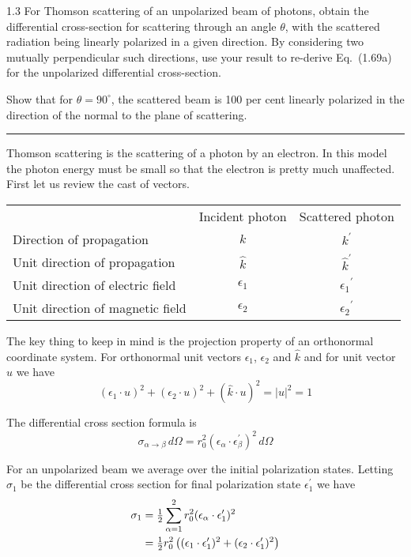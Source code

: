 \documentclass[12pt]{article}
\begin{document}
1.3
For Thomson scattering of an unpolarized beam of photons, obtain the
differential cross-section for scattering through an angle $\theta$,
with the scattered radiation being linearly polarized in a given
direction. By considering two mutually perpendicular such directions,
use your result to re-derive Eq.~(1.69a) for the unpolarized differential
cross-section.

\bigskip
Show that for $\theta=90^\circ$, the scattered beam is
100 per cent linearly polarized in the direction of the normal to the
plane of scattering.

\bigskip
\hrule

\bigskip
Thomson scattering is the scattering of a photon by an electron.
In this model the photon energy must be small so that the electron is
pretty much unaffected.
First let us review the cast of vectors.

\begin{center}
\begin{tabular}{lcc}
& Incident photon & Scattered photon
\\
Direction of propagation & $k$ & $k^\prime$
\\
Unit direction of propagation & $\hat k$ & ${\hat k}^\prime$
\\
Unit direction of electric field & $\epsilon_1$ & ${\epsilon_1}^\prime$
\\
Unit direction of magnetic field & $\epsilon_2$ & ${\epsilon_2}^\prime$
\end{tabular}
\end{center}

The key thing to keep in mind is the projection property of
an orthonormal coordinate system. For orthonormal unit vectors
$\epsilon_1$, $\epsilon_2$ and $\hat k$ and for unit vector $u$
we have
\begin{equation*}
(\epsilon_1\cdot u)^2+(\epsilon_2\cdot u)^2+(\hat k\cdot u)^2=|u|^2=1
\tag{1}
\end{equation*}

The differential cross section formula is
\begin{equation*}
\sigma_{\alpha\rightarrow\beta}\,d\Omega
=r_0^2(\epsilon_\alpha\cdot\epsilon_\beta^\prime)^2\,d\Omega
\end{equation*}

For an unpolarized beam we average over the initial polarization states.
Letting $\sigma_1$ be the differential cross section for final polarization
state $\epsilon_1^\prime$ we have
\begin{align*}
\sigma_1&=\hbox{$1\over2$}\sum_{\alpha=1}^2 r_0^2(\epsilon_\alpha
\cdot\epsilon_1^\prime)^2
\\
&=\hbox{$1\over2$}r_0^2\left((\epsilon_1\cdot\epsilon_1^\prime)^2
+(\epsilon_2\cdot\epsilon_1^\prime)^2\right)
\end{align*}
\end{document}
